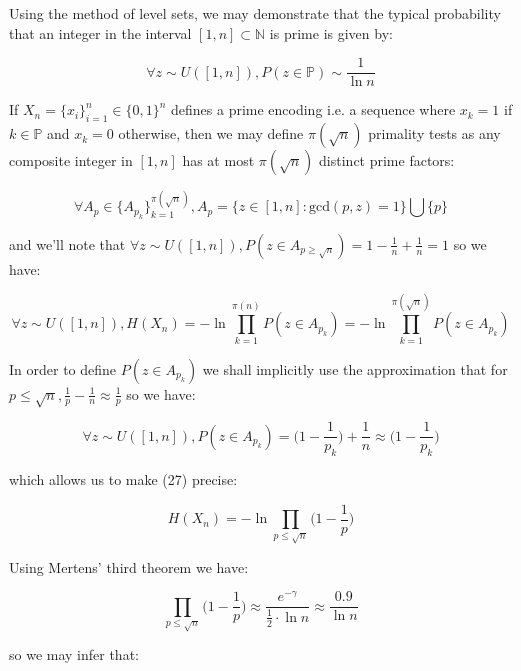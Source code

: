 \documentclass{article}
\begin{document}
Using the method of level sets, we may demonstrate that the typical probability that an
integer in the interval $[1,n] \subset \mathbb{N}$ is prime is given by:

\begin{equation}
\forall z \sim U([1,n]), P(z \in \mathbb{P}) \sim \frac{1}{\ln n}
\end{equation}

If $X_n = \{x_i\}_{i=1}^n \in \{0,1\}^n$ defines a prime encoding i.e. a sequence where $x_k = 1$ if $k \in \mathbb{P}$
and $x_k = 0$ otherwise, then we may define $\pi(\sqrt{n})$ primality tests as any composite integer in $[1,n]$
has at most $\pi(\sqrt{n})$ distinct prime factors:

\begin{equation}
\forall A_p \in \{A_{p_k}\}_{k=1}^{\pi(\sqrt{n})}, A_p = \{z \in [1,n]: \text{gcd}(p,z) = 1\} \bigcup \{p\}
\end{equation}

and we'll note that $\forall z \sim U([1,n]), P(z \in A_{p \geq \sqrt{n}}) = 1- \frac{1}{n} + \frac{1}{n}=1$ so we have: 

\begin{equation}
\forall z \sim U([1,n]), H(X_n) = -\ln \prod_{k=1}^{\pi(n)} P(z \in A_{p_k})
 = -\ln \prod_{k=1}^{\pi(\sqrt{n})} P(z \in A_{p_k})
\end{equation}

In order to define $P(z \in A_{p_k})$ we shall implicitly use the approximation that for $p \leq \sqrt{n}, \frac{1}{p}-\frac{1}{n} \approx \frac{1}{p}$ so we have:

\begin{equation}
\forall z \sim U([1,n]), P(z \in A_{p_k}) = \big(1-\frac{1}{p_k}\big) + \frac{1}{n} \approx \big(1-\frac{1}{p_k}\big)
\end{equation}

which allows us to make (27) precise:

\begin{equation}
H(X_n) = -\ln \prod_{p \leq \sqrt{n}} \big(1-\frac{1}{p}\big)
\end{equation}

Using Mertens' third theorem we have:

\begin{equation}
\prod_{p \leq \sqrt{n}} \big(1-\frac{1}{p}\big) \approx \frac{e^{-\gamma}}{\frac{1}{2} \cdot \ln n} \approx \frac{0.9}{\ln n}
\end{equation}

so we may infer that:
\end{document}
